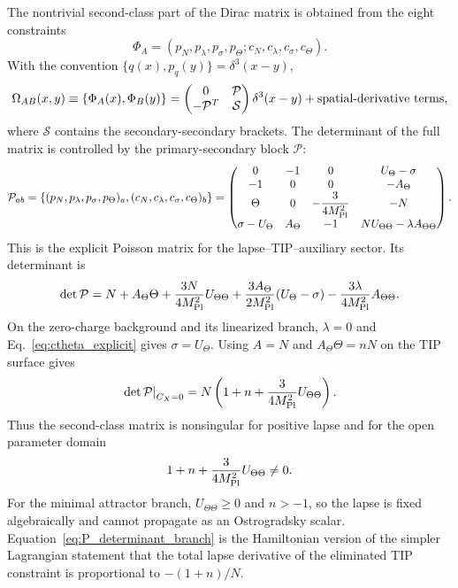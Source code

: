 \documentclass[aps,prd,reprint,nofootinbib,superscriptaddress,longbibliography]{revtex4-2}
\newcommand{\mpl}{M_{\rm Pl}}
\begin{document}
The nontrivial second-class part of the Dirac matrix is obtained from the eight constraints
\begin{equation}
  \Phi_A=(p_N,p_\lambda,p_\sigma,p_\Theta;c_N,c_\lambda,c_\sigma,c_\Theta).
\end{equation}
With the convention $\{q(x),p_q(y)\}=\delta^3(x-y)$,
\begin{equation}
  \Omega_{AB}(x,y)\equiv\{\Phi_A(x),\Phi_B(y)\}
  =\begin{pmatrix}
    0&\mathcal P\\
    -\mathcal P^T&\mathcal S
  \end{pmatrix}\delta^3(x-y)+\hbox{spatial-derivative terms},
  \label{eq:dirac_matrix_block}
\end{equation}
where $\mathcal S$ contains the secondary-secondary brackets. The determinant of the full matrix is controlled by the primary-secondary block $\mathcal P$:
\begin{equation}
  \mathcal P_{a b}=\{(p_N,p_\lambda,p_\sigma,p_\Theta)_a,(c_N,c_\lambda,c_\sigma,c_\Theta)_b\}
  =
  \begin{pmatrix}
    0 & -1 & 0 & U_\Theta-\sigma \\
    -1 & 0 & 0 & -A_\Theta \\
    \Theta & 0 & -\dfrac{3}{4\mpl^2} & -N \\
    \sigma-U_\Theta & A_\Theta & -1 & NU_{\Theta\Theta}-\lambda A_{\Theta\Theta}
  \end{pmatrix} .
  \label{eq:P_matrix_explicit}
\end{equation}
This is the explicit Poisson matrix for the lapse--TIP--auxiliary sector. Its determinant is
\begin{equation}
  \det\mathcal P
  =N+A_\Theta\Theta+\frac{3N}{4\mpl^2}U_{\Theta\Theta}
  +\frac{3A_\Theta}{2\mpl^2}(U_\Theta-\sigma)
  -\frac{3\lambda}{4\mpl^2}A_{\Theta\Theta} .
  \label{eq:P_determinant_explicit}
\end{equation}
On the zero-charge background and its linearized branch, $\lambda=0$ and Eq.~\eqref{eq:ctheta_explicit} gives $\sigma=U_\Theta$. Using $A=N$ and $A_\Theta\Theta=nN$ on the TIP surface gives
\begin{equation}
  \left.\det\mathcal P\right|_{C_X=0}
  =N\left(1+n+\frac{3}{4\mpl^2}U_{\Theta\Theta}\right).
  \label{eq:P_determinant_branch}
\end{equation}
Thus the second-class matrix is nonsingular for positive lapse and for the open parameter domain
\begin{equation}
  1+n+\frac{3}{4\mpl^2}U_{\Theta\Theta}\ne0 .
\end{equation}
For the minimal attractor branch, $U_{\Theta\Theta}\ge0$ and $n>-1$, so the lapse is fixed algebraically and cannot propagate as an Ostrogradsky scalar. Equation~\eqref{eq:P_determinant_branch} is the Hamiltonian version of the simpler Lagrangian statement that the total lapse derivative of the eliminated TIP constraint is proportional to $-(1+n)/N$.
\end{document}
